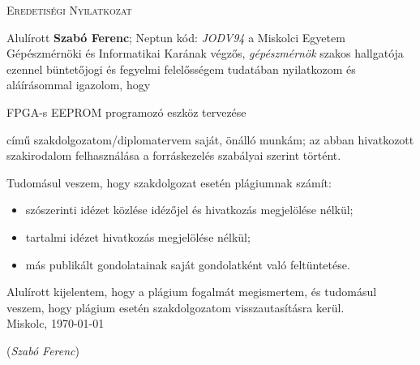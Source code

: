 \documentclass[a4paper,12pt,oneside]{book}
\newcommand{\nev}{Szabó Ferenc}
\newcommand{\neptun}{JODV94}
\newcommand{\cim}{FPGA-s EEPROM programozó eszköz tervezése}
\begin{document}
\clearpage
\thispagestyle{empty}
\begin{center}
	\textsc{\Large{Eredetiségi Nyilatkozat}}
\end{center}
{
Alulírott \textbf{\nev}; Neptun kód: \textit{\neptun} a Miskolci Egyetem Gépészmérnöki és Informatikai Karának végzős, \textit{gépészmérnök} szakos hallgatója ezennel büntetőjogi és fegyelmi felelősségem tudatában nyilatkozom és aláírásommal igazolom, hogy
\begin{center}
	\cim
\end{center}
című szakdolgozatom/diplomatervem saját, önálló munkám; az abban hivatkozott szakirodalom felhasználása a forráskezelés szabályai szerint történt.

Tudomásul veszem, hogy szakdolgozat esetén plágiumnak számít:
\begin{itemize}
	\item 	szószerinti idézet közlése idézőjel és hivatkozás megjelölése nélkül;
	\item	tartalmi idézet hivatkozás megjelölése nélkül;
	\item	más publikált gondolatainak saját gondolatként való feltüntetése.	 
\end{itemize}
Alulírott kijelentem, hogy a plágium fogalmát megismertem, és tudomásul veszem, hogy
plágium esetén szakdolgozatom visszautasításra kerül.\\
Miskolc, \today


{\raggedleft\vspace{1cm}(\textit{\nev})
	
}
}

\mainmatter

\clearpage
\tableofcontents
\listoffigures
\listoftables

\end{document}
